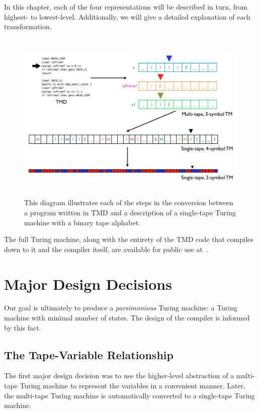 \documentclass[11pt]{report}
\begin{document}
In this chapter, each of the four representations will be described in turn, from highest- to lowest-level. Additionally, we will give a detailed explanation of each transformation. \\

\begin{figure} 
\begin{center} 
\includegraphics[height=3.25in,width=5in,angle=0]{figs/process.png} 
\caption{This diagram illustrates each of the steps in the conversion between a program written in TMD and a description of a single-tape Turing machine with a binary tape alphabet.\label{fig:process}} 
\end{center} 
\end{figure}  


The full Turing machine, along with the entirety of the TMD code that compiles down to it and the compiler itself, are available for public use at~\cite{github}.

\section{Major Design Decisions}

Our goal is ultimately to produce a \emph{parsimonious} Turing machine: a Turing machine with minimal number of states. The design of the compiler is informed by this fact. \\

\subsection{The Tape-Variable Relationship}

The first major design decision was to use the higher-level abstraction of a multi-tape Turing machine to represent the variables in a convenient manner. Later, the multi-tape Turing machine is automatically converted to a single-tape Turing machine.  \\
\end{document}

